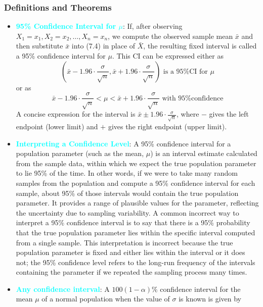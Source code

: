 \documentclass{report}
\begin{document}
    \subsubsection{Definitions and Theorems}
    \begin{itemize}
        \item \textbf{\textcolor{cyan}{95\% Confidence Interval for $\mu$}}: 
            If, after observing $X_1 = x_1, X_2 = x_2, \ldots, X_n = x_n$, we compute the observed sample mean $\bar{x}$ and then substitute $\bar{x}$ into (7.4) in place of $\bar{X}$, the resulting fixed interval is called a 95\% confidence interval for $\mu$. This CI can be expressed either as
            \[
                \left( \bar{x} - 1.96 \cdot \frac{\sigma}{\sqrt{n}}, \bar{x} + 1.96 \cdot \frac{\sigma}{\sqrt{n}} \right) \text{ is a 95\% CI for } \mu
            \]
            or as
            \[
                \bar{x} - 1.96 \cdot \frac{\sigma}{\sqrt{n}} < \mu < \bar{x} + 1.96 \cdot \frac{\sigma}{\sqrt{n}} \text{ with 95\% confidence}
            \]
            A concise expression for the interval is $\bar{x} \pm 1.96 \cdot \frac{\sigma}{\sqrt{n}}$, where $-$ gives the left endpoint (lower limit) and $+$ gives the right endpoint (upper limit).
        \item \textbf{\textcolor{cyan}{Interpreting a Confidence Level}}:
            A 95\% confidence interval for a population parameter (such as the mean, $\mu$) is an interval estimate calculated from the sample data, within which we expect the true population parameter to lie 95\% of the time. In other words, if we were to take many random samples from the population and compute a 95\% confidence interval for each sample, about 95\% of those intervals would contain the true population parameter. It provides a range of plausible values for the parameter, reflecting the uncertainty due to sampling variability.
            \bigbreak \noindent 
            A common incorrect way to interpret a 95\% confidence interval is to say that there is a 95\% probability that the true population parameter lies within the specific interval computed from a single sample. This interpretation is incorrect because the true population parameter is fixed and either lies within the interval or it does not; the 95\% confidence level refers to the long-run frequency of the intervals containing the parameter if we repeated the sampling process many times.
        \item \textbf{\textcolor{cyan}{Any confidence interval}}:
            A \( 100(1 - \alpha) \% \) confidence interval for the mean \(\mu\) of a normal population when the value of \(\sigma\) is known is given by

\end{itemize}
\end{document}
